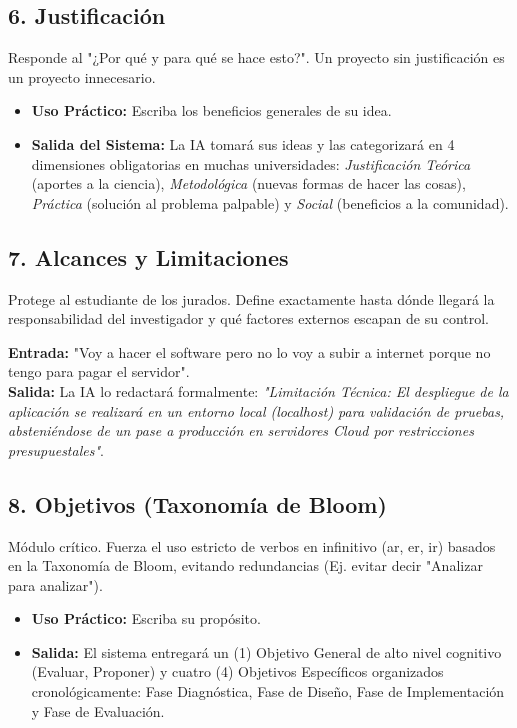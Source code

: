 \documentclass[12pt,a4paper]{article}
\begin{document}
\subsection{6. Justificación}
Responde al "¿Por qué y para qué se hace esto?". Un proyecto sin justificación es un proyecto innecesario.
\begin{itemize}
    \item \textbf{Uso Práctico:} Escriba los beneficios generales de su idea.
    \item \textbf{Salida del Sistema:} La IA tomará sus ideas y las categorizará en 4 dimensiones obligatorias en muchas universidades: \textit{Justificación Teórica} (aportes a la ciencia), \textit{Metodológica} (nuevas formas de hacer las cosas), \textit{Práctica} (solución al problema palpable) y \textit{Social} (beneficios a la comunidad).
\end{itemize}

\subsection{7. Alcances y Limitaciones}
Protege al estudiante de los jurados. Define exactamente hasta dónde llegará la responsabilidad del investigador y qué factores externos escapan de su control.
\begin{tcolorbox}[colback=lightgray, colframe=primary, title=Ejemplo Práctico]
\textbf{Entrada:} "Voy a hacer el software pero no lo voy a subir a internet porque no tengo para pagar el servidor".\\
\textbf{Salida:} La IA lo redactará formalmente: \textit{"Limitación Técnica: El despliegue de la aplicación se realizará en un entorno local (localhost) para validación de pruebas, absteniéndose de un pase a producción en servidores Cloud por restricciones presupuestales"}.
\end{tcolorbox}

\subsection{8. Objetivos (Taxonomía de Bloom)}
Módulo crítico. Fuerza el uso estricto de verbos en infinitivo (ar, er, ir) basados en la Taxonomía de Bloom, evitando redundancias (Ej. evitar decir "Analizar para analizar").
\begin{itemize}
    \item \textbf{Uso Práctico:} Escriba su propósito. 
    \item \textbf{Salida:} El sistema entregará un (1) Objetivo General de alto nivel cognitivo (Evaluar, Proponer) y cuatro (4) Objetivos Específicos organizados cronológicamente: Fase Diagnóstica, Fase de Diseño, Fase de Implementación y Fase de Evaluación.
\end{itemize}
\end{document}
